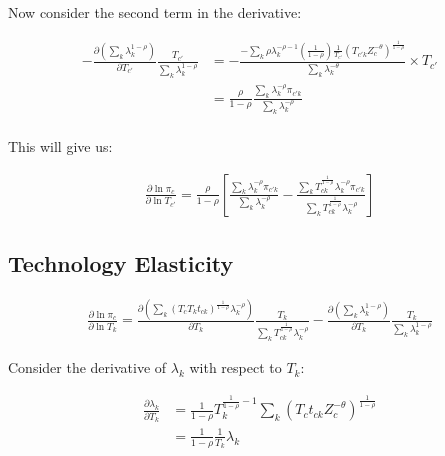 \documentclass[10pt]{article}
\begin{document}
Now consider the second term in the derivative:

\begin{align*}
    - \frac{\partial \left( \sum_{k}^{} \lambda_k^{1 - \rho} \right)}{\partial T_{c'}} \frac{T_{c'}}{\sum_{k}^{} \lambda_k^{1 - \rho}} & = - \frac{- \sum_{k}^{} \rho \lambda_k^{- \rho - 1} \left( \frac{1}{1 - \rho} \right) \frac{1}{T_{c'}} (T_{c'k} Z_c^{- \theta})^{\frac{1}{1 - \rho}}}{\sum_{k}^{} \lambda_k^{- \theta}} \times T_{c'} \\
                                                                                                                                       & = \frac{\rho}{1 - \rho} \frac{\sum_{k}^{} \lambda_k^{- \rho} \pi_{c'k} }{\sum_{k}^{} \lambda_k^{- \rho}}                                                                                              \\
\end{align*}

This will give us:

\begin{align*}
    \frac{\partial \ln \pi_c}{\partial \ln T_{c'}} = \frac{\rho}{1 - \rho} \left[ \frac{\sum_{k}^{} \lambda_k^{- \rho} \pi_{c'k}}{\sum_{k}^{} \lambda_k^{- \rho}} - \frac{\sum_{k}^{} T_{ck}^{\frac{1}{1 - \rho}} \lambda_k^{-\rho} \pi_{c'k}}{\sum_{k}^{} T_{ck}^{\frac{1}{1 - \rho}} \lambda_k^{-\rho}} \right]
\end{align*}

\subsection{Technology Elasticity}

\begin{align*}
    \frac{\partial \ln \pi_c}{\partial \ln T_k} = \frac{\partial \left( \sum_{k}^{} (T_c T_k t_{ck})^{\frac{1}{1 - \rho}} \lambda_k^{- \rho} \right)}{\partial T_k} \frac{T_k}{\sum_{k}^{} T_{ck}^{\frac{1}{1 - \rho}} \lambda_k^{- \rho}} - \frac{\partial \left( \sum_{k}^{} \lambda_k^{1 - \rho} \right)}{\partial T_k} \frac{T_k}{\sum_{k}^{} \lambda_k^{1 - \rho}}
\end{align*}

Consider the derivative of $\lambda_k$ with respect to $T_k$:

\begin{align*}
    \frac{\partial \lambda_k}{\partial T_k} & = \frac{1}{1 - \rho} T_k^{\frac{1}{1 -\rho} - 1} \sum_{k}^{} (T_c t_{ck} Z_c^{- \theta})^{\frac{1}{1 - \rho}} \\
                                            & =\frac{1}{1 - \rho} \frac{1}{T_k} \lambda_k
\end{align*}
\end{document}
